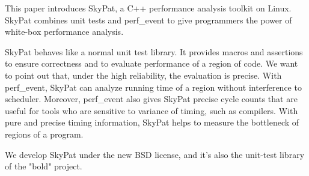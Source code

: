 This paper introduces SkyPat, a C++ performance analysis toolkit on Linux.
SkyPat combines unit tests and perf_event to give programmers the power of white-box performance analysis.

SkyPat behaves like a normal unit test library.
It provides macros and assertions to ensure correctness and to evaluate performance of a region of code.
We want to point out that, under the high reliability, the evaluation is precise.
With perf_event, SkyPat can analyze running time of a region without interference to scheduler. 
Moreover, perf_event also gives SkyPat precise cycle counts that are useful for tools who are sensitive to variance of timing, such as compilers.
With pure and precise timing information, SkyPat helps to measure the bottleneck of regions of a program.

We develop SkyPat under the new BSD license, and it's also the unit-test library of the "bold" project.
